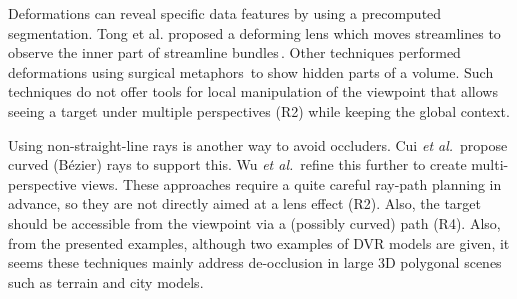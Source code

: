 Deformations can reveal specific data features by using a precomputed segmentation. Tong et al. proposed a deforming lens which moves streamlines to observe the inner part of streamline bundles\,\cite{7332955}. Other techniques performed deformations using surgical metaphors\,\cite{4069230,Correa:2006:FAV:1187627.1187827} to show hidden parts of a volume. Such techniques do not offer tools for local manipulation of the viewpoint that allows seeing a target under multiple perspectives (R2) while keeping the global context. 

Using non-straight-line rays is another way to avoid occluders. Cui \emph{et al.}\,\cite{cui10} propose curved (B{\'e}zier) rays to support this. Wu \emph{et al.}\,\cite{wu16} refine this further to create multi-perspective views. These approaches require a quite careful ray-path planning in advance, so they are not directly aimed at a lens effect (R2). Also, the target should be accessible from the viewpoint via a (possibly curved) path (R4). Also, from the presented examples, although two examples of DVR models are given, it seems these techniques mainly address de-occlusion in large 3D polygonal scenes such as terrain and city models.

